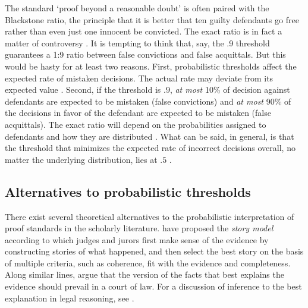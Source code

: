 \documentclass{article}
\begin{document}
 The standard
`proof beyond a reasonable doubt' is often paired with the Blackstone ratio, the principle that it is better that ten guilty defendants go free rather than even just one innocent be convicted. The exact ratio is in fact a matter of controversy \citep{voloch1997}.
It is tempting to think that, say, the .9 threshold guarantees a 1:9 ratio between false convictions and false acquittals. But this would be hasty for at least two reasons.
First, probabilistic thresholds affect the expected rate of mistaken decisions. The actual rate may deviate from its expected value \citep{Kaye1999Clarifying-the-}. Second, if the threshold is $.9$, \textit{at most} 10\% of decision against defendants are expected to be mistaken (false convictions) and \textit{at most} 90\% of the decisions in favor of the defendant are expected to be mistaken (false acquittals). The exact ratio will depend on the probabilities  assigned to defendants and how they are distributed  \citep{allen2014}. 
What can be said, in general, is that the threshold that minimizes the expected rate of incorrect decisions overall, no matter the underlying distribution, lies at $.5$ 
\citep[see][for a proof]{kaye1982limits, Kaye1999Clarifying-the-, cheng2015}. 











\subsection{Alternatives to probabilistic thresholds}







There exist several theoretical alternatives to the probabilistic interpretation of proof standards in the scholarly literature. 
\cite{Pennington1991, penn1993} have proposed the \textit{story model}   according to which judges and jurors first make sense of the evidence by constructing stories of what happened, and then select the best story on the basis of multiple criteria, such as coherence, fit with the evidence and completeness.
Along similar lines, \cite{Pardo2008Judicial-Proof-} argue that the version of the facts that best explains the evidence should prevail in a court of law. For a discussion of inference to the best explanation in legal reasoning, see  \cite{schwartz2019WhatRelativePlausibility,hastie2019CaseRelativePlausibilitya,lai2019HowPlausibleRelative,nance2019LimitationsRelativePlausibility}.%
\end{document}
